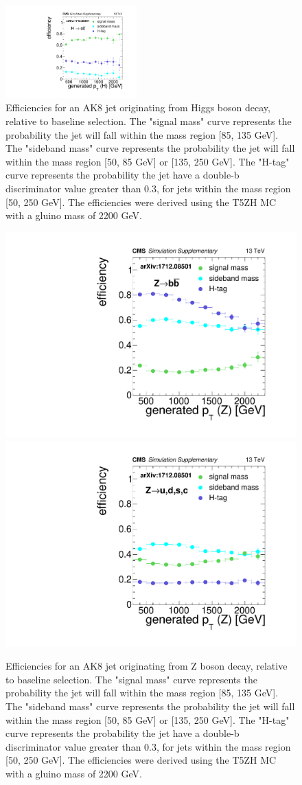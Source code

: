 \begin{figure}
\begin{centering}
\includegraphics[width=0.45\textwidth]{figs/SUS17006/CMS-SUS-17-006_Figure-aux_010.pdf}
\end{centering}
\caption{
Efficiencies for an AK8 jet originating from Higgs boson decay, relative to baseline selection.
The "signal mass" curve represents the probability the jet will fall within the mass region [85, 135 GeV].
The "sideband mass" curve represents the probability the jet will fall within the mass region [50, 85 GeV] or [135, 250 GeV].
The "H-tag" curve represents the probability the jet have a double-b discriminator value greater than 0.3, for jets within the mass region [50, 250 GeV].
The efficiencies were derived using the T5ZH MC with a gluino mass of 2200 GeV.
}
\label{fig:effH}
\end{figure}

\begin{figure}
\centering
\includegraphics[width=0.45\linewidth]{figs/SUS17006/CMS-SUS-17-006_Figure-aux_011.pdf}
\includegraphics[width=0.45\linewidth]{figs/SUS17006/CMS-SUS-17-006_Figure-aux_012.pdf}\\
\caption{
Efficiencies for an AK8 jet originating from Z boson decay, relative to baseline selection.
The "signal mass" curve represents the probability the jet will fall within the mass region [85, 135 GeV].
The "sideband mass" curve represents the probability the jet will fall within the mass region [50, 85 GeV] or [135, 250 GeV].
The "H-tag" curve represents the probability the jet have a double-b discriminator value greater than 0.3, for jets within the mass region [50, 250 GeV].
The efficiencies were derived using the T5ZH MC with a gluino mass of 2200 GeV.
}
\label{fig:effZ}
\end{figure}

